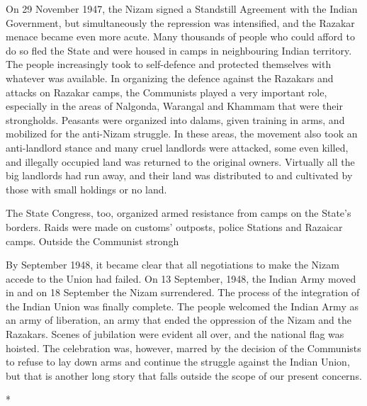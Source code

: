 On 29 November 1947, the Nizam signed a Standstill Agreement with the Indian Government, but simultaneously the repression was intensified, and the Razakar menace became even more acute. Many thousands of people who could afford to do so fled the State and were housed in camps in neighbouring Indian territory. The people increasingly took to self-defence and protected themselves with whatever was available. In organizing the defence against the Razakars and attacks on Razakar camps, the Communists played a very important role, especially in the areas of Nalgonda, Warangal and Khammam that were their strongholds. Peasants were organized into dalams, given training in arms, and mobilized for the anti-Nizam struggle. In these areas, the movement also took an anti-landlord stance and many cruel landlords were attacked, some even killed, and illegally occupied land was returned to the original owners. Virtually all the big landlords had run away, and their land was distributed to and cultivated by those with small holdings or no land. 

The State Congress, too, organized armed resistance from camps on the State's borders. Raids were made on customs' outposts, police Stations and Razaicar camps. Outside the Communist strongh%

By September 1948, it became clear that all negotiations to make the Nizam accede to the Union had failed. On 13 September, 1948, the Indian Army moved in and on 18 September the Nizam surrendered. The process of the integration of the Indian Union was finally complete. The people welcomed the Indian Army as an army of liberation, an army that ended the oppression of the Nizam and the Razakars. Scenes of jubilation were evident all over, and the national flag was hoisted. The celebration was, however, marred by the decision of the Communists to refuse to lay down arms and continue the struggle against the Indian Union, but that is another long story that falls outside the scope of our present concerns.

\begin{center}*\end{center}

\paragraph*{}


